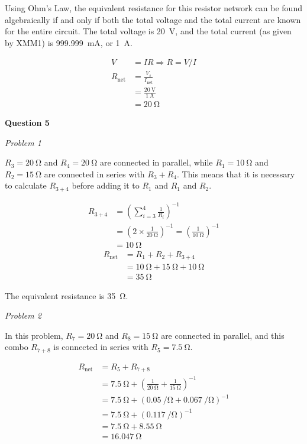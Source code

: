 \documentclass{article}
\begin{document}
Using Ohm's Law, the equivalent resistance for this resistor network
can be found algebraically if and only if both the total voltage and the
total current are known for the entire circuit. The total voltage is
\SI{20}{\volt}, and the total current (as given by XMM1) is
\SI{999.999}{\milli\ampere}, or \SI{1}{\ampere}.

\begin{align*}
    V &= IR \Rightarrow R = V/I\\
    R_{\text{net}} &= \frac{V_s}{I_{\text{net}}}\\
    &= \frac{ \SI{20}{\volt} }{ \SI{1}{\ampere} }\\
    &= \SI{20}{\ohm}
\end{align*}

\textbf{Question 5}

\textit{Problem 1}

$R_3 = \SI{20}{\ohm}$ and $R_4 = \SI{20}{\ohm}$ are connected in parallel,
while $R_1 = \SI{10}{\ohm}$ and $R_2 = \SI{15}{\ohm}$ are connected in
series with $R_3 + R_4$. This means that it is necessary to calculate
$R_{3+4}$ before adding it to $R_1$ and $R_1$ and $R_2$.

\begin{align*}
    R_{3+4} &= \left( \sum_{i=3}^4 \frac1{R_i} \right)^{-1}\\
    &= \left( 2 \times \frac1{\SI{20}{\ohm}} \right)^{-1}
    = \left( \frac1{\SI{10}{\ohm}} \right)^{-1} \\
    &= \SI{10}{\ohm}
\end{align*}
\begin{align*}
    R_{\text{net}} &= R_1 + R_2 + R_{3+4}\\
    &= \SI{10}{\ohm} + \SI{15}{\ohm} + \SI{10}{\ohm}\\
    &= \SI{35}{\ohm}
\end{align*}

The equivalent resistance is \SI{35}{\ohm}.

\indent\textit{Problem 2}

In this problem, $R_7 = \SI{20}{\ohm}$ and $R_8 = \SI{15}{\ohm}$ are
connected in parallel, and this combo $R_{7+8}$ is connected in series with
$R_5 = \SI{7.5}{\ohm}$.

\begin{align*}
    R_{\text{net}} &= R_5 + R_{7+8}\\
    &= \SI{7.5}{\ohm} + \left( \frac1{\SI{20}{\ohm}} + \frac1{\SI{15}{\ohm}} \right)^{-1}\\
    &= \SI{7.5}{\ohm} + \left( \SI{0.05}{\per\ohm} + \SI{0.067}{\per\ohm} \right)^{-1}\\
    &= \SI{7.5}{\ohm} + \left( \SI{0.117}{\per\ohm} \right)^{-1}\\
    &= \SI{7.5}{\ohm} + \SI{8.55}{\ohm}\\
    &= \SI{16.047}{\ohm}
\end{align*}
\end{document}
